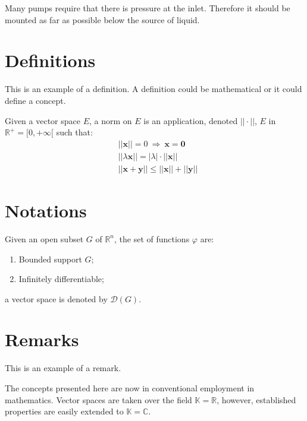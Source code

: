 \documentclass[11pt,fleqn]{book} %
\begin{document}
Many pumps require that there is pressure at the inlet. Therefore it should be mounted as far as possible below the source of liquid.


\section{Definitions}

This is an example of a definition. A definition could be mathematical or it could define a concept.

\begin{definition}
Given a vector space $E$, a norm on $E$ is an application, denoted $||\cdot||$, $E$ in $\mathbb{R}^+=[0,+\infty[$ such that:
\begin{align}
& ||\mathbf{x}||=0\ \Rightarrow\ \mathbf{x}=\mathbf{0}\\
& ||\lambda \mathbf{x}||=|\lambda|\cdot ||\mathbf{x}||\\
& ||\mathbf{x}+\mathbf{y}||\leq ||\mathbf{x}||+||\mathbf{y}||
\end{align}
\end{definition}


\section{Notations}

\begin{notation}
Given an open subset $G$ of $\mathbb{R}^n$, the set of functions $\varphi$ are:
\begin{enumerate}
\item Bounded support $G$;
\item Infinitely differentiable;
\end{enumerate}
a vector space is denoted by $\mathcal{D}(G)$. 
\end{notation}


\section{Remarks}

This is an example of a remark.

\begin{remark}
The concepts presented here are now in conventional employment in mathematics. Vector spaces are taken over the field $\mathbb{K}=\mathbb{R}$, however, established properties are easily extended to $\mathbb{K}=\mathbb{C}$.
\end{remark}
\end{document}
